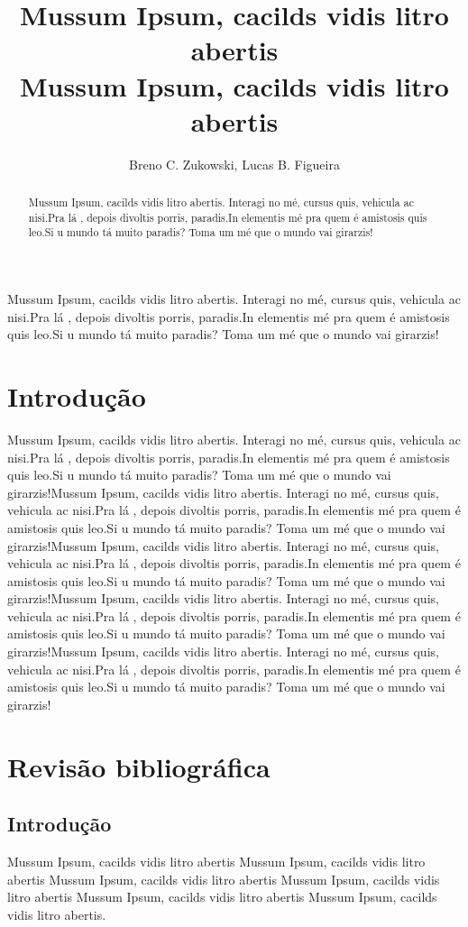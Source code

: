\documentclass[12pt]{article}
\title{Mussum Ipsum, cacilds vidis litro abertis\\ Mussum Ipsum, cacilds vidis litro abertis}
\author{Breno C. Zukowski\inst{1}, Lucas B. Figueira\inst{1}}
\begin{document}
\maketitle

\begin{abstract}
  Mussum Ipsum, cacilds vidis litro abertis. Interagi no mé, cursus quis, vehicula ac nisi.Pra lá , depois divoltis porris, paradis.In elementis mé pra quem é amistosis quis leo.Si u mundo tá muito paradis? Toma um mé que o mundo vai girarzis!
\end{abstract}

\begin{resumo}
  Mussum Ipsum, cacilds vidis litro abertis. Interagi no mé, cursus quis, vehicula ac nisi.Pra lá , depois divoltis porris, paradis.In elementis mé pra quem é amistosis quis leo.Si u mundo tá muito paradis? Toma um mé que o mundo vai girarzis!
\end{resumo}


\section{Introdução}

Mussum Ipsum, cacilds vidis litro abertis. Interagi no mé, cursus quis, vehicula ac nisi.Pra lá , depois divoltis porris, paradis.In elementis mé pra quem é amistosis quis leo.Si u mundo tá muito paradis? Toma um mé que o mundo vai girarzis!Mussum Ipsum, cacilds vidis litro abertis. Interagi no mé, cursus quis, vehicula ac nisi.Pra lá , depois divoltis porris, paradis.In elementis mé pra quem é amistosis quis leo.Si u mundo tá muito paradis? Toma um mé que o mundo vai girarzis!Mussum Ipsum, cacilds vidis litro abertis. Interagi no mé, cursus quis, vehicula ac nisi.Pra lá , depois divoltis porris, paradis.In elementis mé pra quem é amistosis quis leo.Si u mundo tá muito paradis? Toma um mé que o mundo vai girarzis!Mussum Ipsum, cacilds vidis litro abertis. Interagi no mé, cursus quis, vehicula ac nisi.Pra lá , depois divoltis porris, paradis.In elementis mé pra quem é amistosis quis leo.Si u mundo tá muito paradis? Toma um mé que o mundo vai girarzis!Mussum Ipsum, cacilds vidis litro abertis. Interagi no mé, cursus quis, vehicula ac nisi.Pra lá , depois divoltis porris, paradis.In elementis mé pra quem é amistosis quis leo.Si u mundo tá muito paradis? Toma um mé que o mundo vai girarzis!

\section{Revisão bibliográfica}

\subsection{Introdução}
Mussum Ipsum, cacilds vidis litro abertis \cite{Goodfellow-et-al-2016} Mussum Ipsum, cacilds vidis litro abertis Mussum Ipsum, cacilds vidis litro abertis Mussum Ipsum, cacilds vidis litro abertis Mussum Ipsum, cacilds vidis litro abertis Mussum Ipsum, cacilds vidis litro abertis.







\end{document}
